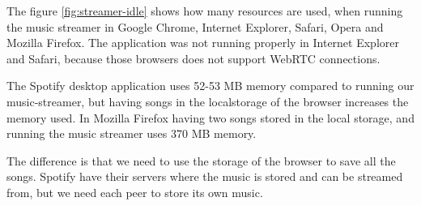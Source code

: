 The figure \ref{fig:streamer-idle} shows how many resources are used,
when running the music streamer in Google Chrome, Internet Explorer, Safari, Opera and Mozilla Firefox.
The application was not running properly in Internet Explorer and Safari, because those browsers does not support WebRTC connections.

The Spotify desktop application uses 52-53 MB memory compared to running our music-streamer,
but having songs in the localstorage of the browser increases the memory used. 
In Mozilla Firefox having two songs stored in the local storage,
and running the music streamer uses 370 MB memory.

The difference is that we need to use the storage of the browser to save all the songs.
Spotify have their servers where the music is stored and can be streamed from,
but we need each peer to store its own music.



